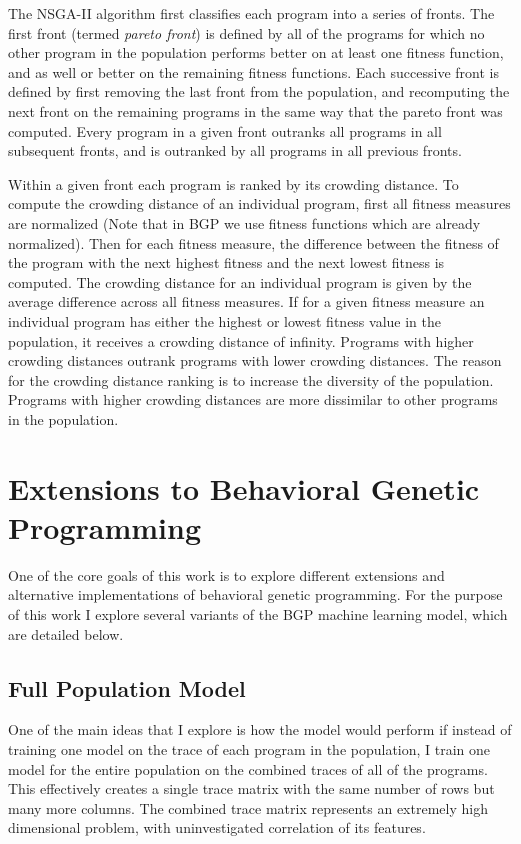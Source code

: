 The NSGA-II algorithm first classifies each program into a series of fronts.  The first front (termed \textit{pareto front}) is defined by all of the programs for which no other program in the population performs better on at least one fitness function, and as well or better on the remaining fitness functions.  Each successive front is defined by first removing the last front from the population, and recomputing the next front on the remaining programs in the same way that the pareto front was computed.  Every program in a given front outranks all programs in all subsequent fronts, and is outranked by all programs in all previous fronts.

Within a given front each program is ranked by its crowding distance.  To compute the crowding distance of an individual program, first all fitness measures are normalized (Note that in BGP we use fitness functions which are already normalized).  Then for each fitness measure, the difference between the fitness of the program with the next highest fitness and the next lowest fitness is computed.  The crowding distance for an individual program is given by the average difference across all fitness measures.  If for a given fitness measure an individual program has either the highest or lowest fitness value in the population, it receives a crowding distance of infinity.  Programs with higher crowding distances outrank programs with lower crowding distances.  The reason for the crowding distance ranking is to increase the diversity of the population.  Programs with higher crowding distances are more dissimilar to other programs in the population.

\section{Extensions to Behavioral Genetic Programming}
\label{section:extensions}
One of the core goals of this work is to explore different extensions and alternative implementations of behavioral genetic programming.  For the purpose of this work I explore several variants of the BGP machine learning model, which are detailed below.

\subsection{Full Population Model}
One of the main ideas that I explore is how the model would perform if instead of training one model on the trace of each program in the population, I train one model for the entire population on the combined traces of all of the programs.  This effectively creates a single trace matrix with the same number of rows but many more columns.  The combined trace matrix represents an extremely high dimensional problem, with uninvestigated correlation of its features.

